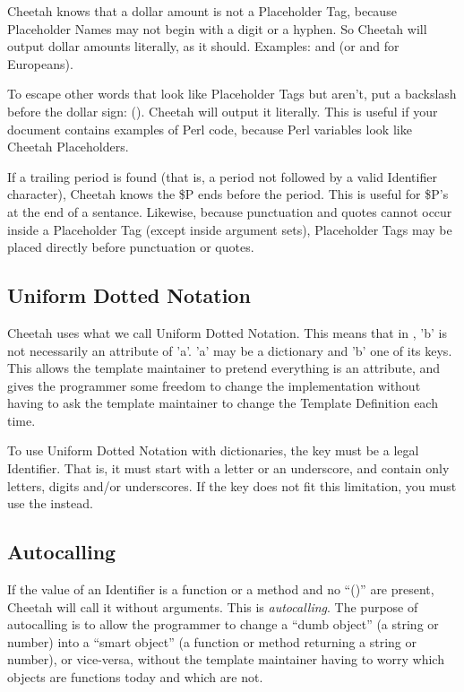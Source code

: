 Cheetah knows that a dollar amount is not a Placeholder Tag, because
Placeholder Names may not begin with a digit or a hyphen.  So Cheetah will
output dollar amounts literally, as it should.  Examples:
 and  (or  and 
for Europeans).

To escape other words that look like Placeholder Tags but aren't, put a 
backslash before the dollar sign: ().  Cheetah
will output it literally.  This is useful if your document contains examples of
Perl code, because Perl variables look like Cheetah Placeholders.

If a trailing period is found (that is, a period not followed by a valid
Identifier character), Cheetah knows the \$P ends before the
period.  This is useful for \$P's at the end of a sentance.  Likewise, because
punctuation and quotes cannot occur inside a Placeholder Tag (except inside
argument sets), Placeholder Tags may be placed directly before punctuation or
quotes.

     

\subsection{Uniform Dotted Notation}

Cheetah uses what we call Uniform Dotted Notation.  This means that in
, 'b' is not necessarily an attribute of 'a'.  'a' may be a
dictionary and 'b' one of its keys.  This allows the template maintainer to
pretend everything is an attribute, and gives the programmer some freedom to
change the implementation without having to ask the template maintainer to
change the Template Definition each time.

To use Uniform Dotted Notation with dictionaries, the key must be a legal
Identifier.  That is, it must start with a letter or an underscore, and contain
only letters, digits and/or underscores.  If the key does not fit this
limitation, you must use the  instead.


\subsection{Autocalling}

If the value of an Identifier is a function or a method and no ``()'' are
present, Cheetah will call it without arguments.  This is {\em autocalling}.
The purpose of autocalling is to allow the programmer to change a ``dumb
object'' (a string or number) into a ``smart object'' (a function or method
returning a string or number), or vice-versa, without the template maintainer
having to worry which objects are functions today and which are not.

